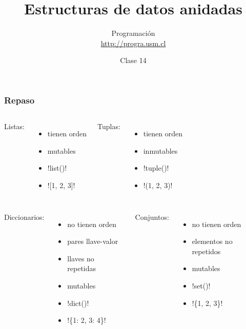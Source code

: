 \documentclass[12pt]{beamer}
\title{Estructuras de datos anidadas}
\author{
  Programación \\ \url{http://progra.usm.cl}
}
\date{Clase 14}
\begin{document}
  \begin{frame}
    \maketitle
  \end{frame}

  \begin{frame}
    \label{repaso}
    \frametitle{Repaso}
    \small
    \def\sep{-1ex}
    \begin{columns}[T]
        Listas:
        \begin{itemize}
          \setlength{\itemsep}{\sep}
          \item tienen orden
          \item mutables
          \item \li!list()!
          \item \li![1, 2, 3]!
        \end{itemize}
        Tuplas:
        \begin{itemize}
          \setlength{\itemsep}{\sep}
          \item tienen orden
          \item inmutables
          \item \li!tuple()!
          \item \li!(1, 2, 3)!
        \end{itemize}
    \end{columns}
    \vfill
    \begin{columns}[T]
        Diccionarios:
        \begin{itemize}
          \setlength{\itemsep}{\sep}
          \item no tienen orden
          \item pares llave-valor
          \item llaves no repetidas
          \item mutables
          \item \li!dict()!
          \item \li!\{1: 2, 3: 4\}!
        \end{itemize}
        Conjuntos:
        \begin{itemize}
          \setlength{\itemsep}{\sep}
          \item no tienen orden
          \item elementos no repetidos
          \item mutables
          \item \li!set()!
          \item \li!\{1, 2, 3\}!
        \end{itemize}
    \end{columns}
  \end{frame}
\end{document}
